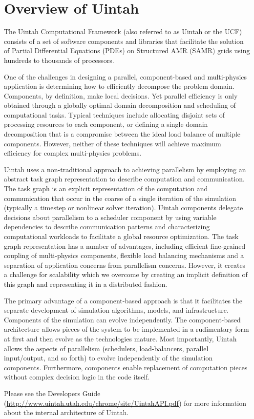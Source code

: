 \chapter{Overview of Uintah} \label{Sec:Overview} The Uintah
Computational Framework (also referred to as Uintah or the UCF)
consists of a set of software components and libraries that facilitate
the solution of Partial Differential Equations (PDEs) on Structured
AMR (SAMR) grids using hundreds to thousands of processors.

One of the challenges in designing a parallel, component-based and
multi-physics application is determining how to efficiently decompose
the problem domain. Components, by definition, make local
decisions. Yet parallel efficiency is only obtained through a globally
optimal domain decomposition and scheduling of computational
tasks. Typical techniques include allocating disjoint sets of
processing resources to each component, or defining a single domain
decomposition that is a compromise between the ideal load balance of
multiple components. However, neither of these techniques will achieve
maximum efficiency for complex multi-physics problems.

Uintah uses a non-traditional approach to achieving parallelism by
employing an abstract task graph representation to describe
computation and communication. The task graph is an explicit
representation of the computation and communication that occur in the
coarse of a single iteration of the simulation (typically a timestep
or nonlinear solver iteration). Uintah components delegate decisions
about parallelism to a scheduler component by using variable
dependencies to describe communication patterns and characterizing
computational workloads to facilitate a global resource
optimization. The task graph representation has a number of
advantages, including efficient fine-grained coupling of multi-physics
components, flexible load balancing mechanisms and a separation of
application concerns from parallelism concerns. However, it creates a
challenge for scalability which we overcome by creating an implicit
definition of this graph and representing it in a distributed fashion.


The primary advantage of a component-based approach is that it
facilitates the separate development of simulation algorithms, models,
and infrastructure. Components of the simulation can evolve
independently. The component-based architecture allows pieces of the
system to be implemented in a rudimentary form at first and then
evolve as the technologies mature. Most importantly, Uintah allows the
aspects of parallelism (schedulers, load-balancers, parallel
input/output, and so forth) to evolve independently of the simulation
components. Furthermore, components enable replacement of computation
pieces without complex decision logic in the code itself.

Please see the Developers Guide
(\url{http://www.uintah.utah.edu/chrome/site/UintahAPI.pdf}) for more
information about the internal architecture of Uintah.
